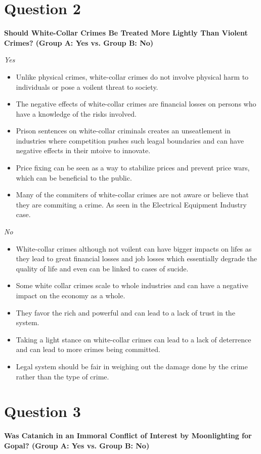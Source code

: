\documentclass{article}
\begin{document}
\section*{Question 2}
\textbf{Should White-Collar Crimes Be Treated More Lightly Than Violent Crimes? (Group A: Yes vs. Group B: No)}

\textit{Yes}
\begin{itemize}
    \item Unlike physical crimes, white-collar crimes do not involve physical harm to individuals or pose a voilent threat to society.
    \item The negative effects of white-collar crimes are financial losses on persons who have a knowledge of the risks involved.
    \item Prison sentences on white-collar criminals creates an unseatlement in industries where competition pushes such leagal boundaries and can have negative effects in their mtoive to innovate.
    \item Price fixing can be seen as a way to stabilize prices and prevent price wars, which can be beneficial to the public.
    \item Many of the commiters of white-collar crimes are not aware or believe that they are commiting a crime. As seen in the Electrical Equipment Industry case.
\end{itemize}

\textit{No}
\begin{itemize}
    \item White-collar crimes although not voilent can have bigger impacts on lifes as they lead to great financial losses and job losses which essentially degrade the quality of life and even can be linked to cases of sucide.
    \item Some white collar crimes scale to whole industries and can have a negative impact on the economy as a whole.
    \item They favor the rich and powerful and can lead to a lack of trust in the system.
    \item Taking a light stance on white-collar crimes can lead to a lack of deterrence and can lead to more crimes being committed.
    \item Legal system should be fair in weighing out the damage done by the crime rather than the type of crime.
\end{itemize}

\section*{Question 3}
\textbf{Was Catanich in an Immoral Conflict of Interest by Moonlighting for Gopal? (Group A: Yes vs. Group B: No)}
\end{document}
